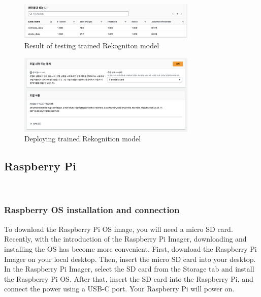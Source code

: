\begin{figure}[h]
    \centering
    \includegraphics[width=8.5cm]{images/rek_result.png}
    \caption{Result of testing trained Rekogniton model}
\end{figure}


\begin{figure}[h]
    \centering
    \includegraphics[width=8.5cm]{images/rek_deploy.png}
    \caption{Deploying trained Rekognition model}
\end{figure}


\subsection{\textbf{Raspberry Pi}}
\\

\subsubsection{\textbf{Raspberry OS installation and connection}}
To download the Raspberry Pi OS image, you will need a micro SD card. Recently, with the introduction of the Raspberry Pi Imager, downloading and installing the OS has become more convenient.
First, download the Raspberry Pi Imager on your local desktop. Then, insert the micro SD card into your desktop. In the Raspberry Pi Imager, select the SD card from the Storage tab and install the Raspberry Pi OS.
After that, insert the SD card into the Raspberry Pi, and connect the power using a USB-C port. Your Raspberry Pi will power on.\\

